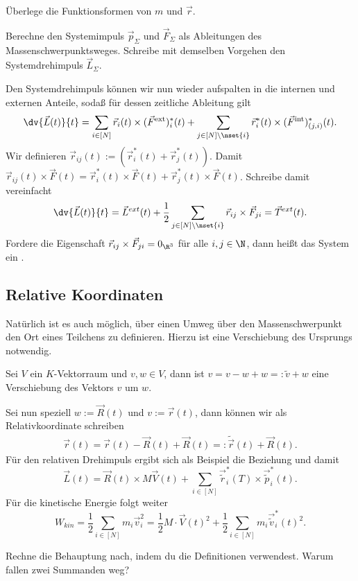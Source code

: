 \documentclass[../main.tex]{subfiles}
\begin{document}
		\begin{Aufgabe}
			\nr Überlege die Funktionsformen von $m$ und $\vec{r}$. 
			
			\nr Berechne den Systemimpuls $\vec p_\Sigma$ und $\vec F_{\Sigma}$ als Ableitungen des Massenschwerpunktsweges. Schreibe mit demselben Vorgehen den Systemdrehimpuls $\vec L_\Sigma$. 
		\end{Aufgabe}
		\noindent Den Systemdrehimpuls können wir nun wieder aufspalten in die internen und externen Anteile, sodaß für dessen zeitliche Ableitung gilt
		\begin{align*}
			\dv{\vec{L}(t)}{t}=\sum_{i\in[N]}\vec{r}_i(t)\times(\vec{F}^{\text{ext}})_i^*(t)+\sum_{j\in[N]\setminus\nset{i}}\vec{r}_i^*(t)\times(\vec{F}^{\text{int}})_{(j,i)}^*(t).
		\end{align*}
		Wir definieren $\vec{r}_{ij}(t):=(\vec{r}_i^*(t)+\vec{r}^*_j(t))$. Damit $\vec{r}_{ij}(t)\times\vec F(t)=\vec{r}_i^*(t)\times\vec{F}(t)+\vec{r}_j^*(t)\times\vec{F}(t)$. Schreibe damit vereinfacht
		\begin{align*}
			\dv{\vec{L}(t)}{t}=\vec{L}^{ext}(t)+\frac{1}{2}\sum_{j\in[N]\setminus\nset{i}}\vec{r}_{ij}\times\vec{F}_{ji}=\vec{T}^{ext}(t).
		\end{align*} 
		Fordere die Eigenschaft $\vec{r}_{ij}\times\vec{F}_{ji}=0_{\R^3}$ für alle $i,j\in\N$, dann heißt das System ein \so{Zentralkraftfeld}. 
		\subsection*{Relative Koordinaten}
			Natürlich ist es auch möglich, über einen Umweg über den Massenschwerpunkt den Ort eines Teilchens zu definieren. Hierzu ist eine Verschiebung des Ursprungs notwendig. 
			\begin{info}
				Sei $V$ ein $K$-Vektorraum und $v,w\in V$, dann ist $v=v-w+w=:\tilde v+w$ eine Verschiebung des Vektors $v$ um $w$. 
			\end{info}
			\noindent Sei nun speziell $w:=\vec R(t)$ und $v:=\vec r(t)$, dann können wir als Relativkoordinate schreiben 
			\begin{align*}
				\vec{r}(t)=\vec r(t)-\vec{R}(t)+\vec R(t)=:\tilde{\vec r}(t)+\vec R(t). 
			\end{align*}
			Für den relativen Drehimpuls ergibt sich als Beispiel die Beziehung 
			und damit 
			$$\vec{L}(t)=\vec{R}(t)\times M\vec{V}(t)+\sum_{i\in[N]}\vec{\tilde r}_i^*(T)\times\vec{\tilde p}_i^*(t).$$
			Für die kinetische Energie folgt weiter 
			$$W_{kin}=\frac{1}{2}\sum_{i\in[N]}m_i\vec{v}_i^2=\frac{1}{2}M\cdot\vec V(t)^2+\frac{1}{2}\sum_{i\in[N]}m_i\vec{\tilde v}_i^*(t)^2.$$
			\begin{Aufgabe}
				\nr[Drehimpulsverschiebung] Rechne die Behauptung nach, indem du die Definitionen verwendest. Warum fallen zwei Summanden weg?
			\end{Aufgabe}
			
\end{document}
